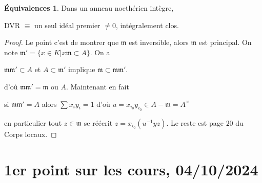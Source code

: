 \documentclass[a4paper,12pt]{book}
\newcommand{\m}{\mathfrak m}
\theoremstyle{plain}
\theoremstyle{definition}
\newtheorem*{eq}{Équivalences}
\theoremstyle{remark}
\begin{document}
\begin{eq}
    Dans un anneau noethérien intègre, 
    \begin{center}
	DVR $\equiv$ un seul idéal premier $\ne 0$, intégralement clos.
    \end{center}
\end{eq}
\begin{proof}
    Le point c'est de montrer que $\m$ est inversible, alors $\m$ est
    principal. On note $\m'=\{x\in K|x\m\subset A\}$. On a 
    \begin{center}
	$\m\m'\subset A$ et $A\subset \m'$ implique $\m\subset \m\m'$.
    \end{center}
    d'où $\m\m'=\m$ ou $A$.
    Maintenant en fait
    \begin{center}
	si $\m\m'=A$ alors $\sum x_iy_i=1$ d'où 
	$u=x_{i_0}y_{i_0}\in A-\m=A^{\times}$ 
    \end{center}
    en particulier tout 
    $z\in\m$ se réécrit $z=x_{i_0}(u^{-1}yz)$.
    Le reste est page $20$ du Corps locaux.
\end{proof}

\chapter{1er point sur les cours, 04/10/2024}
\end{document}
